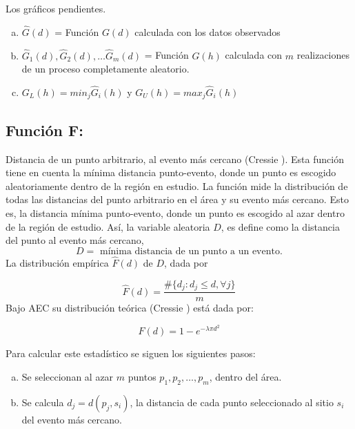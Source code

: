 \documentclass[12pt]{report}
\begin{document}
		
		Los gráficos pendientes.  
		
		\begin{enumerate}[a.-]
			
			\item  $\widehat{G}(d)$ = Función $G(d)$ calculada con los datos observados
			
			\item  $\widehat{G}_{1}(d), \widehat{G}_{2}(d), \dots  \widehat{G}_{m}(d)$ = Función $G(h)$  calculada con $m$ realizaciones de un proceso completamente aleatorio.   
			
			\item  $G_{L}(h) = min_{j}\widehat{G}_{i}(h)$     y    $G_{U}(h) = max_{j} \widehat{G}_{i}(h)  $
			
		\end{enumerate}
		
		
		
		\subsection*{Función F:} Distancia de un punto arbitrario, al evento más cercano (Cressie \cite{Cress}).  Esta función tiene en cuenta la mínima distancia punto-evento, donde un punto es  escogido aleatoriamente dentro de la región en estudio. La función mide la distribución de todas las distancias del punto arbitrario en el área y su evento  más cercano. Esto es, la distancia mínima punto-evento, donde un punto es  escogido al azar  dentro de la región de estudio. Así, la variable aleatoria $D$, es define como la distancia del punto al   evento  más cercano, \[ D  = \text{ mínima distancia de un punto a un evento}.\]   La distribución  empírica $\widehat{F}(d)$ de $D$,  dada por  
		
		\[ \widehat{F}(d) = \frac{\#\{d_{j} : d_{j} \leq d , \forall j\} }{m}\]     Bajo AEC su distribución teórica (Cressie \cite{Cress}) está dada por:             
		
		\[ F(d) = 1 - e^{-\lambda \pi d^{2}} \] 
		
		
		
		
		Para calcular este estadístico se siguen los siguientes pasos:
		
		\begin{enumerate}[a.-]
			
			\item   Se seleccionan  al azar $m$ puntos   ${  p_{1},  p_{2},  \dots , p_{m} } $, dentro del área.
			
			\item   Se calcula $d_{j} = d(p_{j}, s_{i})$, la distancia de cada punto seleccionado al sitio $s_{i}$ del evento más cercano.
			
		\end{enumerate}
		
\end{document}
